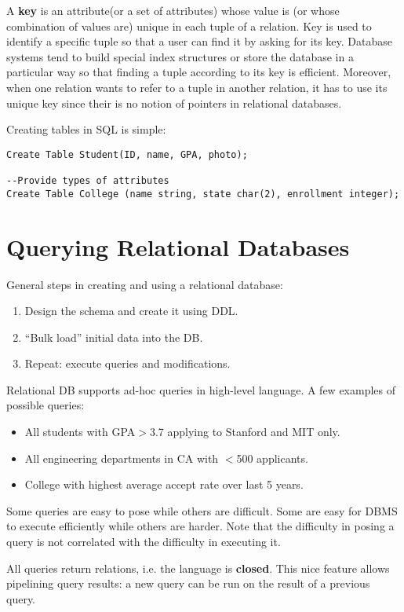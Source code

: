 A \textbf{key} is an attribute(or a set of attributes) whose value is (or whose combination of values are) unique in each tuple of a relation. Key is used to identify a specific tuple so that a user can find it by asking for its key. Database systems tend to build special index structures or store the database in a particular way so that finding a tuple according to its key is efficient. Moreover, when one relation wants to refer to a tuple in another relation, it has to use its unique key since their is no notion of pointers in relational databases.

Creating tables in SQL is simple:
\begin{lstlisting}
Create Table Student(ID, name, GPA, photo);

--Provide types of attributes
Create Table College (name string, state char(2), enrollment integer);
\end{lstlisting}
\section{Querying Relational Databases}
General steps in creating and using a relational database:
\begin{enumerate}
\item Design the schema and create it using DDL.
\item ``Bulk load'' initial data into the DB. 
\item Repeat: execute queries and modifications.
\end{enumerate}
Relational DB supports ad-hoc queries in high-level language. A few examples of possible queries:
\begin{itemize}
\item All students with GPA$>$3.7 applying to Stanford and MIT only.
\item All engineering departments in CA with $<$500 applicants.
\item College with highest average accept rate over last 5 years.
\end{itemize}
Some queries are easy to pose while others are difficult. Some are easy for DBMS to execute efficiently while others are harder. Note that the difficulty in posing a query is not correlated with the difficulty in executing it.

All queries return relations, i.e. the language is \textbf{closed}. This nice feature allows pipelining query results: a new query can be run on the result of a previous query.

